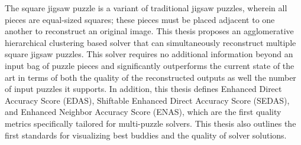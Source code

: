 The square jigsaw puzzle is a variant of traditional jigsaw puzzles, wherein all pieces are equal-sized squares; these pieces must be placed adjacent to one another to reconstruct an original image.  This thesis proposes an agglomerative hierarchical clustering based solver that can simultaneously reconstruct multiple square jigsaw puzzles.  This solver requires no additional information beyond an input bag of puzzle pieces and significantly outperforms the current state of the art in terms of both the quality of the reconstructed outputs as well the number of input puzzles it supports.  In addition, this thesis defines Enhanced Direct Accuracy Score (EDAS), Shiftable Enhanced Direct Accuracy Score (SEDAS), and Enhanced Neighbor Accuracy Score (ENAS), which are the first quality metrics specifically tailored for multi-puzzle solvers.  This thesis also outlines the first  standards for visualizing best buddies and the quality of solver solutions. 

